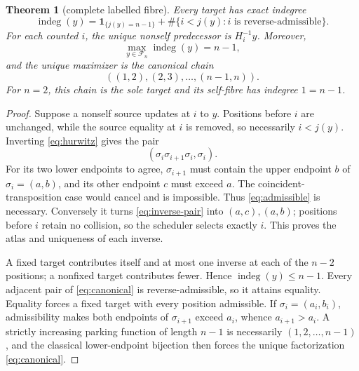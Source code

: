 \documentclass[a4paper,10pt]{amsart}
\newtheorem{theorem}{Theorem}[section]
\theoremstyle{remark}
\newcommand{\Fcal}{\mathcal F}
\newcommand{\indeg}{\operatorname{indeg}}
\begin{document}
\begin{theorem}[complete labelled fibre]\label{thm:fibre}
Every target has exact indegree
\begin{equation}\label{eq:fibre}
 \indeg(y)=\mathbf1_{\{j(y)=n-1\}}
 +\#\{i<j(y):i\text{ is reverse-admissible}\}.
\end{equation}
For each counted $i$, the unique nonself predecessor is $H_i^{-1}y$.
Moreover,
\begin{equation}\label{eq:max-fibre}
 \max_{y\in\Fcal_n}\indeg(y)=n-1,
\end{equation}
and the unique maximizer is the canonical chain
\begin{equation}\label{eq:canonical}
                 ((1,2),(2,3),\ldots,(n-1,n)).
\end{equation}
For $n=2$, this chain is the sole target and its self-fibre has indegree
$1=n-1$.
\end{theorem}

\begin{proof}
Suppose a nonself source updates at $i$ to $y$.  Positions before $i$ are
unchanged, while the source equality at $i$ is removed, so necessarily
$i<j(y)$.  Inverting \eqref{eq:hurwitz} gives the pair
\begin{equation}\label{eq:inverse-pair}
 (\sigma_i\sigma_{i+1}\sigma_i,\sigma_i).
\end{equation}
For its two lower endpoints to agree, $\sigma_{i+1}$ must contain the upper
endpoint $b$ of $\sigma_i=(a,b)$, and its other endpoint $c$ must exceed
$a$.  The coincident-transposition case would cancel and is impossible.
Thus \eqref{eq:admissible} is necessary.  Conversely it turns
\eqref{eq:inverse-pair} into $(a,c),(a,b)$; positions before $i$ retain no
collision, so the scheduler selects exactly $i$.  This proves the atlas and
uniqueness of each inverse.

A fixed target contributes itself and at most one inverse at each of the
$n-2$ positions; a nonfixed target contributes fewer.  Hence
$\indeg(y)\le n-1$.  Every adjacent pair of \eqref{eq:canonical} is
reverse-admissible, so it attains equality.  Equality forces a fixed target
with every position admissible.  If $\sigma_i=(a_i,b_i)$, admissibility makes
both endpoints of $\sigma_{i+1}$ exceed $a_i$, whence
$a_{i+1}>a_i$.  A strictly increasing parking function of length $n-1$ is
necessarily $(1,2,\ldots,n-1)$, and the classical lower-endpoint bijection
then forces the unique factorization \eqref{eq:canonical}.
\end{proof}
\end{document}
